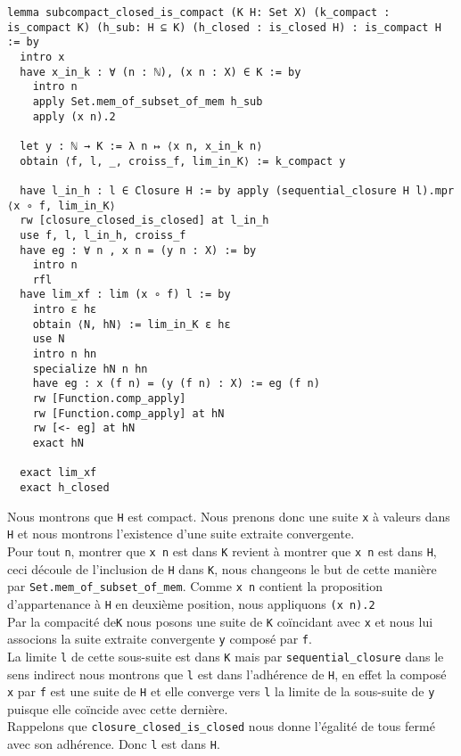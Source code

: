 \documentclass[a4paper, 12pt]{article}
\newcommand{\lean}[1]{\texttt{#1}}
\begin{document}
\begin{verbatim}
lemma subcompact_closed_is_compact (K H: Set X) (k_compact : is_compact K) (h_sub: H ⊆ K) (h_closed : is_closed H) : is_compact H := by
  intro x
  have x_in_k : ∀ (n : ℕ), (x n : X) ∈ K := by
    intro n
    apply Set.mem_of_subset_of_mem h_sub
    apply (x n).2

  let y : ℕ → K := λ n ↦ ⟨x n, x_in_k n⟩
  obtain ⟨f, l, _, croiss_f, lim_in_K⟩ := k_compact y

  have l_in_h : l ∈ Closure H := by apply (sequential_closure H l).mpr ⟨x ∘ f, lim_in_K⟩
  rw [closure_closed_is_closed] at l_in_h
  use f, l, l_in_h, croiss_f
  have eg : ∀ n , x n = (y n : X) := by
    intro n
    rfl
  have lim_xf : lim (x ∘ f) l := by
    intro ε hε
    obtain ⟨N, hN⟩ := lim_in_K ε hε
    use N
    intro n hn
    specialize hN n hn
    have eg : x (f n) = (y (f n) : X) := eg (f n)
    rw [Function.comp_apply]
    rw [Function.comp_apply] at hN
    rw [<- eg] at hN
    exact hN

  exact lim_xf
  exact h_closed
\end{verbatim}

Nous montrons que \lean{H} est compact. Nous prenons donc une suite \lean{x} à valeurs dans \lean{H} et nous montrons l'existence d'une suite extraite convergente.\\

Pour tout \lean{n}, montrer que \lean{x n} est dans \lean{K} revient à montrer que \lean{x n} est dans \lean{H}, ceci découle de l'inclusion de \lean{H} dans \lean{K}, nous changeons le but de cette manière par \lean{Set.mem_of_subset_of_mem}. Comme \lean{x n} contient la proposition d'appartenance à \lean{H} en deuxième position, nous appliquons \lean{(x n).2}\\

Par la compacité de\lean{K} nous posons une suite de \lean{K} coïncidant avec \lean{x} et nous lui associons la suite extraite convergente \lean{y} composé par \lean{f}.\\

La limite \lean{l} de cette sous-suite est dans \lean{K} mais par \lean{sequential_closure} dans le sens indirect nous montrons que \lean{l} est dans l'adhérence de \lean{H}, en effet la composé \lean{x} par \lean{f} est une suite de \lean{H} et elle converge vers \lean{l} la limite de la sous-suite de \lean{y} puisque elle coïncide avec cette dernière.\\

Rappelons que \lean{closure_closed_is_closed} nous donne l'égalité de tous fermé avec son adhérence. Donc \lean{l} est dans \lean{H}.\\
\end{document}
